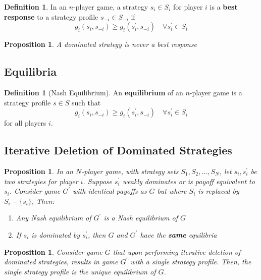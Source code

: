\documentclass[11pt]{article}
\theoremstyle{plain}
\newtheorem{proposition}[theorem]{Proposition}
\theoremstyle{definition}
\newtheorem{definition}[theorem]{Definition}
\theoremstyle{remark}
\begin{document}
\begin{definition}
    In an \(n\)-player game, a strategy \(s_{i} \in S_{i}\) for player \(i\) is a \textbf{best response} to a strategy profile \(s_{-i} \in S_{-i}\) if
    \[
        g_{i}(s_{i},s_{-i}) \geq g_{i}(s_{i}^\prime,s_{-i}) \quad \forall s_{i}^\prime \in S_{i}
    \]
\end{definition}

\begin{proposition}
    A dominated strategy is never a best response
\end{proposition}

\setcounter{subsection}{5} 
\subsection{Equilibria}
\begin{definition}[Nash Equilibrium]
    An \textbf{equilibrium} of an \(n\)-player game is a strategy profile \(s \in S\) such that
    \[
        g_{i}(s_{i},s_{-i}) \geq g_{i}(s_{i}^\prime,s_{-i}) \quad \forall s_{i}^\prime \in S_{i}
    \]
    for all players \(i\).
\end{definition}

\setcounter{subsection}{7} 
\subsection{Iterative Deletion of Dominated Strategies}

\begin{proposition}
    In an \(N\)-player game, with strategy sets \(S_1, S_2, \ldots , S_{N} \), let \(s_{i}, s_{i}^\prime \) be two strategies for player \(i\). Suppose \(s_{i}^\prime \) weakly dominates or is payoff equivalent to \(s_{i} \). Consider game \(G^\prime \) with identical payoffs as \(G\) but where \(S_{i}\) is replaced by \(S_{i} - \{s_{i}\}\), Then:
    \begin{enumerate}
        \item Any Nash equilibrium of \(G^\prime \) is a Nash equilibrium of \(G\)
        \item If \(s_{i} \) is dominated by \(s_{i}^\prime \), then \(G\) and \(G^\prime \) have the \textbf{same} equilibria
    \end{enumerate}
\end{proposition}

\begin{proposition}
    Consider game \(G\) that upon performing iterative deletion of dominated strategies, results in game \(G^\prime \) with a single strategy profile. Then, the single strategy profile is the unique equilibrium of \(G\).
\end{proposition}
\end{document}
